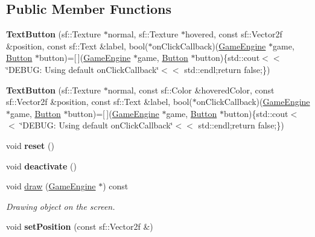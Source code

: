 \subsection*{Public Member Functions}
\begin{DoxyCompactItemize}
\item 
\mbox{\label{class_text_button_abb0c1feb5fef0f0716045cae77fe1a42}} 
{\bfseries Text\+Button} (sf\+::\+Texture $\ast$normal, sf\+::\+Texture $\ast$hovered, const sf\+::\+Vector2f \&position, const sf\+::\+Text \&label, bool($\ast$on\+Click\+Callback)(\mbox{\hyperlink{class_game_engine}{Game\+Engine}} $\ast$game, \mbox{\hyperlink{class_button}{Button}} $\ast$button)=\mbox{[}$\,$\mbox{]}(\mbox{\hyperlink{class_game_engine}{Game\+Engine}} $\ast$game, \mbox{\hyperlink{class_button}{Button}} $\ast$button)\{std\+::cout$<$$<$ \char`\"{}D\+E\+B\+U\+G\+: Using default on\+Click\+Callback\char`\"{}$<$$<$ std\+::endl;return false;\})
\item 
\mbox{\label{class_text_button_a31beb0aab9b5f05ebe7f8141632b2eea}} 
{\bfseries Text\+Button} (sf\+::\+Texture $\ast$normal, const sf\+::\+Color \&hovered\+Color, const sf\+::\+Vector2f \&position, const sf\+::\+Text \&label, bool($\ast$on\+Click\+Callback)(\mbox{\hyperlink{class_game_engine}{Game\+Engine}} $\ast$game, \mbox{\hyperlink{class_button}{Button}} $\ast$button)=\mbox{[}$\,$\mbox{]}(\mbox{\hyperlink{class_game_engine}{Game\+Engine}} $\ast$game, \mbox{\hyperlink{class_button}{Button}} $\ast$button)\{std\+::cout$<$$<$ \char`\"{}D\+E\+B\+U\+G\+: Using default on\+Click\+Callback\char`\"{}$<$$<$ std\+::endl;return false;\})
\item 
\mbox{\label{class_text_button_aed840bcd62454c1233d4eadaa8b6e3b5}} 
void {\bfseries reset} ()
\item 
\mbox{\label{class_text_button_a8b0c38245988615e9cae8795b2f177cd}} 
void {\bfseries deactivate} ()
\item 
\mbox{\label{class_text_button_a8af6b4a6e9084f157ffb015d29a02fcf}} 
void \mbox{\hyperlink{class_text_button_a8af6b4a6e9084f157ffb015d29a02fcf}{draw}} (\mbox{\hyperlink{class_game_engine}{Game\+Engine}} $\ast$) const
\begin{DoxyCompactList}\small\item\em Drawing object on the screen. \end{DoxyCompactList}\item 
\mbox{\label{class_text_button_a4550c33ce65f77b9e9e119526bfcc357}} 
void {\bfseries set\+Position} (const sf\+::\+Vector2f \&)
\end{DoxyCompactItemize}
